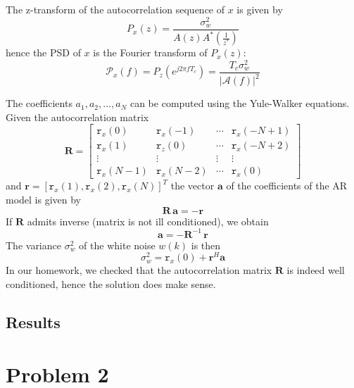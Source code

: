 \documentclass[a4paper, 12pt]{report}
\begin{document}
The z-transform of the autocorrelation sequence of $x$ is given by
\begin{equation}
	P_x(z) = \frac{\sigma_w^2}{A(z) A^{*} \left( \frac{1}{z^{*}} \right) }
\end{equation}
hence the PSD of $x$ is the Fourier transform of $P_x(z)$:
\begin{equation}
	\mathcal{P}_x(f) = P_z(e^{j 2 \pi f T_c})= \frac{T_c \sigma_w^2}{|\mathcal{A}(f)|^2}
\end{equation}

The coefficients $a_1, a_2, ..., a_N$ can be computed using the Yule-Walker equations. Given the autocorrelation matrix
\begin{equation}
\mathbf{R} =
\begin{bmatrix}
\mathtt{r}_x(0)		&	\mathtt{r}_x(-1) 	& \cdots &	\mathtt{r}_x(-N+1) \\
\mathtt{r}_x(1)		&	\mathtt{r}_z(0)  	& \cdots &	\mathtt{r}_x(-N+2) \\
\vdots				&	\vdots        		& \vdots &	\vdots \\
\mathtt{r}_x(N-1)	&	\mathtt{r}_x(N-2)	& \cdots &	\mathtt{r}_x(0)
\end{bmatrix}
\end{equation}
and $ \mathbf{r} = [\mathtt{r}_x(1),  \mathtt{r}_x(2),  \mathtt{r}_x(N)]^T $ the vector $\mathbf{a}$ of the coefficients of the AR model is given by
\begin{equation}\label{eq:yukewalker}
	\mathbf{R} \, \mathbf{a} = - \mathbf{r}
\end{equation}
If $\mathbf{R}$ admits inverse (matrix is not ill conditioned), we obtain
\begin{equation}
	\mathbf{a} = -\mathbf{R}^{-1} \, \mathbf{r}
\end{equation}
The variance $\sigma_w ^2$ of the white noise $w(k)$ is then
\begin{equation}
	\sigma_w ^2 = \mathtt{r}_x(0) + \mathbf{r}^H \mathbf{a}
\end{equation}
In our homework, we checked that the autocorrelation matrix $\mathbf{R}$ is indeed well conditioned, hence the solution does make sense.

\subsection*{Results}

\section*{Problem 2}
\end{document}
